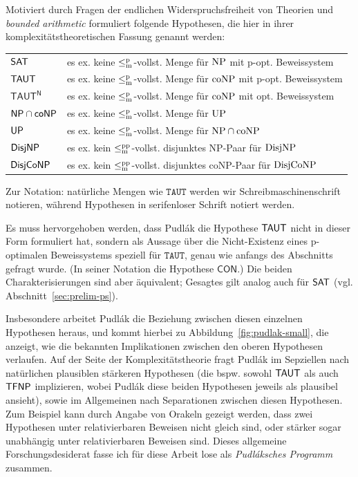 Motiviert durch Fragen der endlichen Widerspruchsfreiheit von Theorien und \emph{bounded arithmetic} formuliert \textcite{pudlak_incompleteness_2017} folgende Hypothesen, die hier in ihrer komplexitätstheoretischen Fassung genannt werden:\par
\bigskip
\begin{tabular}{l@{\quad:\quad}l}
    $\mathsf{SAT}$ & es ex. keine $\leq_\mathrm{m}^\mathrm{p}$-vollst. Menge für $\mathrm{NP}$ mit p-opt. Beweissystem\\
    $\mathsf{TAUT}$ & es ex. keine $\leq_\mathrm{m}^\mathrm{p}$-vollst. Menge für $\mathrm{coNP}$ mit p-opt. Beweissystem\\
    $\mathsf{TAUT^N}$ & es ex. keine $\leq_\mathrm{m}^\mathrm{p}$-vollst. Menge für $\mathrm{coNP}$ mit opt. Beweissystem\\
    $\mathsf{NP}{}\cap{}\mathsf{coNP}$ & es ex. keine $\leq_\mathrm{m}^\mathrm{p}$-vollst. Menge für $\mathrm{UP}$\\
    $\mathsf{UP}$ & es ex. keine $\leq_\mathrm{m}^\mathrm{p}$-vollst. Menge für $\mathrm{NP}\cap\mathrm{coNP}$\\
    $\mathsf{DisjNP}$ & es ex. kein $\leq_\mathrm{m}^\mathrm{pp}$-vollst. disjunktes NP-Paar für $\mathrm{DisjNP}$\\
    $\mathsf{DisjCoNP}$ & es ex. kein $\leq_\mathrm{m}^\mathrm{pp}$-vollst. disjunktes coNP-Paar für $\mathrm{DisjCoNP}$
\end{tabular}\par
\bigskip\noindent
Zur Notation: natürliche Mengen wie $\mathtt{TAUT}$ werden wir Schreibmaschinenschrift notieren, während Hypothesen in serifenloser Schrift notiert werden.


Es muss hervorgehoben werden, dass Pudlák die Hypothese $\mathsf{TAUT}$ nicht in dieser Form formuliert hat, sondern als Aussage über die Nicht-Existenz eines p-optimalen Beweissystems speziell für $\mathtt{TAUT}$, genau wie anfangs des Abschnitts gefragt wurde. (In seiner Notation die Hypothese $\mathsf{CON}$.) Die beiden Charakterisierungen sind aber äquivalent; Gesagtes gilt analog auch für $\mathsf{SAT}$ (vgl. Abschnitt~\ref{sec:prelim-ps}).


Insbesondere arbeitet Pudlák die Beziehung zwischen diesen einzelnen Hypothesen heraus, und kommt hierbei zu Abbildung~\ref{fig:pudlak-small}, die anzeigt, wie die bekannten Implikationen zwischen den oberen Hypothesen verlaufen.
Auf der Seite der Komplexitätstheorie fragt Pudlák im Sepziellen nach natürlichen plausiblen stärkeren Hypothesen (die bspw. sowohl $\mathsf{TAUT}$ als auch $\mathsf{TFNP}$ implizieren, wobei Pudlák diese beiden Hypothesen jeweils als plausibel ansieht), sowie im Allgemeinen nach Separationen zwischen diesen Hypothesen. Zum Beispiel kann durch Angabe von Orakeln gezeigt werden, dass zwei Hypothesen unter relativierbaren Beweisen nicht gleich sind, oder stärker sogar unabhängig unter relativierbaren Beweisen sind. 
Dieses allgemeine Forschungsdesiderat fasse ich für diese Arbeit lose als \emph{Pudláksches Programm} zusammen.

